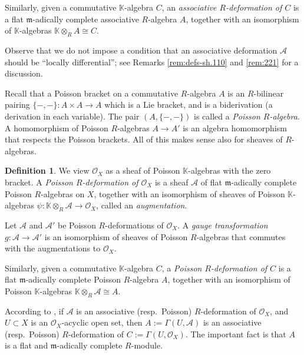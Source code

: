 \documentclass[a4paper, 10pt]{amsart}
\theoremstyle{definition}
\newtheorem{dfn}[equation]{Definition}
\numberwithin{equation}{section}
\newcommand{\mfrak}[1]{\mathfrak{#1}}
\newcommand{\mcal}[1]{\mathcal{#1}}
\newcommand{\mbb}[1]{\mathbb{#1}}
\newcommand{\K}{\mbb{K}}
\renewcommand{\AA}{\mcal{A}}
\newcommand{\m}{\mfrak{m}}
\newcommand{\OX}{\mcal{O}_X}
\begin{document}
Similarly, given a commutative $\K$-algebra $C$, an {\em associative
$R$-deformation of $C$} is a flat $\m$-adically complete associative
$R$-algebra $A$, together with an isomorphism of $\K$-algebras
$\K \otimes_R A \cong C$. 

Observe that we do not impose a condition that an associative deformation $\AA$
should be ``locally differential''; see Remarks \ref{rem:defs-sh.110} and
\ref{rem:221} for a discussion. 

Recall that a Poisson bracket on a commutative $R$-algebra $A$ is 
an $R$-bilinear pairing 
$\{ -,- \} : A \times A \to A$ 
which is a Lie bracket, and is a biderivation (a derivation in each variable). 
The pair $(A, \{ -,- \} )$ is called a {\em Poisson $R$-algebra}. 
A homomorphism of Poisson $R$-algebras $A \to A'$ is an algebra homomorphism
that respects the Poisson brackets. All of this makes sense also for sheaves of
$R$-algebras. 

\begin{dfn} \label{dfn:231}
We view $\mcal{O}_X$ as a sheaf of Poisson $\K$-algebras
with the zero bracket.
A {\em Poisson $R$-deformation of $\mcal{O}_X$} is a sheaf
$\mcal{A}$ of flat $\m$-adically complete Poisson
$R$-algebras on $X$, together with an isomorphism of
sheaves of Poisson $\K$-algebras
$\psi : \K \otimes_R \mcal{A} \to \mcal{O}_X$, called an {\em augmentation}.

 Let $\mcal{A}$ and $\mcal{A}'$ be Poisson $R$-deformations of
$\mcal{O}_X$. A {\em gauge transformation}
$g : \mcal{A} \to \mcal{A}'$
is an isomorphism of sheaves of Poisson $R$-algebras that commutes with
the augmentations to $\mcal{O}_X$.
\end{dfn}

Similarly, given a commutative $\K$-algebra $C$, a {\em Poisson $R$-deformation
of $C$} is a flat $\m$-adically complete Poisson $R$-algebra $A$, together with
an isomorphism of Poisson $\K$-algebras $\K \otimes_R \mcal{A} \cong A$.

According to \cite[Proposition 4.5]{Ye9}, if $\mcal{A}$ is an associative
(resp.\ Poisson) $R$-deformation of $\OX$, and $U \subset X$ is an $\OX$-acyclic
open set, then $A := \Gamma(U, \mcal{A})$ is an associative
(resp.\ Poisson) $R$-deformation of $C :=  \Gamma(U, \OX)$.
The important fact is that $A$ is a flat and $\m$-adically complete
$R$-module.
\end{document}
